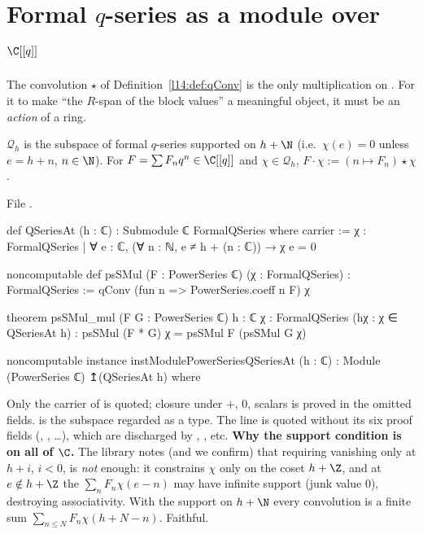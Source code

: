 \section{Formal \texorpdfstring{$q$}{q}-series as a module over \texorpdfstring{$\C[[q]]$}{C[[q]]}}\label{l14:sec:qconvmodule}

The convolution $\star$ of Definition~\ref{l14:def:qConv} is the only multiplication on . For it to make
``the $R$-span of the block values'' a meaningful object, it must be an \emph{action} of a ring.

\begin{definition}\label{l14:def:QSeriesAt}
$\mathcal Q_h$ is the subspace of formal $q$-series supported on $h+\N$ (i.e.\ $\chi(e) = 0$ unless $e = h+n$, $n\in\N$). For
$F = \sum F_nq^n\in\C[[q]]$ and $\chi\in\mathcal Q_h$, $F\cdot\chi := (n\mapsto F_n)\star\chi$.
\end{definition}
\noindent File .
\begin{leancode}
def QSeriesAt (h : ℂ) : Submodule ℂ FormalQSeries where
  carrier := {χ : FormalQSeries | ∀ e : ℂ, (∀ n : ℕ, e ≠ h + (n : ℂ)) → χ e = 0}

noncomputable def psSMul (F : PowerSeries ℂ) (χ : FormalQSeries) : FormalQSeries :=
  qConv (fun n => PowerSeries.coeff n F) χ

theorem psSMul_mul (F G : PowerSeries ℂ) {h : ℂ} {χ : FormalQSeries} (hχ : χ ∈ QSeriesAt h) :
    psSMul (F * G) χ = psSMul F (psSMul G χ)

noncomputable instance instModulePowerSeriesQSeriesAt (h : ℂ) :
    Module (PowerSeries ℂ) ↥(QSeriesAt h) where
\end{leancode}
\begin{dictionary}
Only the carrier of  is quoted; closure under $+$, $0$, scalars is proved in the omitted fields.
 is the subspace regarded as a type. The  line is quoted without its six proof fields
(, , \dots), which are discharged by , , etc.
\textbf{Why the support condition is on all of $\C$.} The library notes (and we confirm) that requiring vanishing only at
$h+i$, $i<0$, is \emph{not} enough: it constrains $\chi$ only on the coset $h+\Z$, and at $e\notin h+\Z$ the 
$\sum_n F_n\chi(e-n)$ may have infinite support (junk value $0$), destroying associativity. With the support on $h+\N$ every
convolution is a finite sum $\sum_{n\le N}F_n\chi(h+N-n)$. Faithful.
\end{dictionary}
